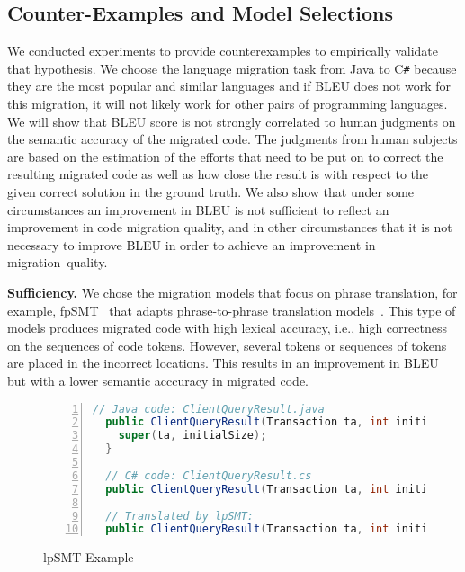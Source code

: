 \subsection{Counter-Examples and Model Selections}


We conducted experiments to provide counterexamples to empirically
validate that hypothesis. We choose the language migration task from
Java to C\texttt{\#} because they are the most popular and similar
languages and if BLEU does not work for this migration, it will not
likely work for other pairs of programming languages.
%
We will show that BLEU score is not strongly correlated to human
judgments on the semantic accuracy of the migrated code. The judgments
from human subjects are based on the estimation of the efforts that
need to be put on to correct the resulting migrated code as well as
how close the result is with respect to the given correct solution in
the ground truth.
%
We also show that under some circumstances an improvement in BLEU is
not sufficient to reflect an improvement in code migration quality,
and in other circumstances that it is not necessary to improve BLEU in
order to achieve an improvement in migration~quality.

{\bf Sufficiency.} We chose the migration models that focus on phrase
translation, for example, fpSMT~\cite{fse13-nier,karaivanov14} that
adapts phrase-to-phrase translation models~\cite{phrasal10}. This type
of models produces migrated code with high lexical accuracy, i.e.,
high correctness on the sequences of code tokens. However, several
tokens or sequences of tokens are placed in the incorrect locations.
This results in an improvement in BLEU but with a lower semantic
acccuracy in migrated code.


\begin{figure}[t]
\centering
\begin{lstlisting}[basicstyle=\small\sffamily, stepnumber=1, numbers=left, language=Java, aboveskip=1pt,  belowskip=1pt, numbersep=-5pt]
  // Java code: ClientQueryResult.java
  public ClientQueryResult(Transaction ta, int initialSize) {
    super(ta, initialSize);
  }

  // C# code: ClientQueryResult.cs
  public ClientQueryResult(Transaction ta, int initialSize) : base(ta, initialSize) {}

  // Translated by lpSMT:
  public ClientQueryResult(Transaction ta, int initialSize) : base(ta {, initialSize) ; }
\end{lstlisting}
\caption{lpSMT Example}
\label{fig:issueexample2}
\end{figure}

